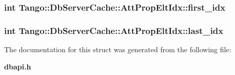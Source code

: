 \subsubsection[{first\-\_\-idx}]{\setlength{\rightskip}{0pt plus 5cm}int Tango\-::\-Db\-Server\-Cache\-::\-Att\-Prop\-Elt\-Idx\-::first\-\_\-idx}\label{structTango_1_1DbServerCache_1_1AttPropEltIdx_a4a1ad16bd2dd0c0a4c7196c408856ef8}
\subsubsection[{last\-\_\-idx}]{\setlength{\rightskip}{0pt plus 5cm}int Tango\-::\-Db\-Server\-Cache\-::\-Att\-Prop\-Elt\-Idx\-::last\-\_\-idx}\label{structTango_1_1DbServerCache_1_1AttPropEltIdx_a9445ae28cbac2d7d50a428779f4ed5b0}


The documentation for this struct was generated from the following file\-:\begin{DoxyCompactItemize}
\item 
{\bf dbapi.\-h}\end{DoxyCompactItemize}
